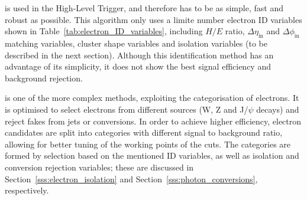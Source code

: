 \begin{description}[wide=\parindent]
  \item[Simple cut-based ID] \autocite{SCB_ID} is used in the High-Level Trigger, and therefore has to be as simple,
fast and robust as possible. This algorithm only uses a limite number electron ID variables shown in
Table~\ref{tab:electron_ID_variables}, including $H/E$ ratio, $\Delta\eta_{\text{in}}$ and $\Delta\phi_{\text{in}}$
matching variables, cluster shape variables and isolation variables (to be described in the next section). Although this
identification method has an advantage of its simplicity, it does not show the best signal efficiency and background
rejection.

 \item[Cuts in categories ID] \autocite{CiC_ID} is one of the more complex methods, exploiting the categorisation of
electrons. It is optimised to select electrons from different sources (W, Z and J/$\psi$ decays) and reject fakes from
jets or conversions. In order to achieve higher efficiency, electron candidates are split into categories with different
signal to background ratio, allowing for better tuning of the working points of the cuts. The categories are formed by
selection based on the mentioned ID variables, as well as isolation and conversion rejection variables; these are
discussed in Section~\ref{sss:electron_isolation} and Section~\ref{sss:photon_conversions}, respectively.





\end{description}
